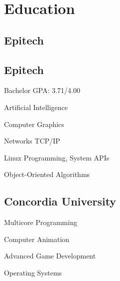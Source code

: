 \documentclass[
  english,
  letterpaper
]{resume-openfont}
\begin{document}
\noindent%
\begin{minipage}[t]{0.31\textwidth}



\section{Education}

\subsection{Epitech}
\subtitle{Master in Computer Science}
\sectionsep

\subsection{Epitech}
\subtitle{BS in Computer Science}
Bachelor GPA: 3.71/4.00
\vspace{0.8\topsep} %
\begin{coursework}
\item Artificial Intelligence
\item Computer Graphics
\item Networks TCP/IP
\item Linux Programming, System APIs
\item Object-Oriented Algorithms
\end{coursework}
\sectionsep

\subsection{Concordia University}
\subtitle{Visiting student in Computer Sciences, Graduate Level}
\begin{coursework}
\item Multicore Programming
\item Computer Animation
\item Advanced Game Development
\item Operating Systems
\end{coursework}



\end{minipage}
\end{document}
